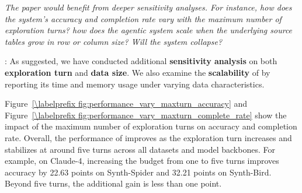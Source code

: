 \begin{shaded}
{
 \emph{The paper would benefit from deeper sensitivity analyses. For instance, how does the system's accuracy and completion rate vary with the maximum number of exploration turns? how does the agentic system scale when the underlying source tables grow in row or column size? Will the system collapse?}
}
\end{shaded} %

:
As suggested, we have conducted additional \textbf{sensitivity analysis} on both \textbf{exploration turn} and \textbf{data size}. We also examine the \textbf{scalability} of \sys by reporting its time and memory usage under varying data characteristics.


Figure~\ref{\labelprefix fig:performance_vary_maxturn_accuracy} and Figure~\ref{\labelprefix fig:performance_vary_maxturn_complete_rate} show the impact of the maximum number of exploration turns on accuracy and completion rate. Overall, the performance of \sys improves as the exploration turn increases and stabilizes at around five turns across all datasets and model backbones. For example, on Claude-4, increasing the budget from one to five turns improves accuracy by 22.63 points on Synth-Spider and 32.21 points on Synth-Bird. Beyond five turns, the additional gain is less than one point. 


